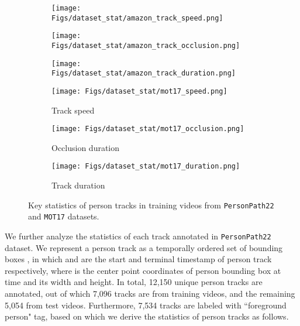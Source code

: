 \documentclass[runningheads]{llncs}
\begin{document}
\begin{figure}[t]
\centering

    \begin{subfigure}{0.26\textwidth}
        \centering
        \texttt{[image: Figs/dataset\_stat/amazon\_track\_speed.png]}
    \end{subfigure}\begin{subfigure}{0.26\textwidth}
        \centering
        \texttt{[image: Figs/dataset\_stat/amazon\_track\_occlusion.png]}
    \end{subfigure}\begin{subfigure}{0.26\textwidth}
        \centering
        \texttt{[image: Figs/dataset\_stat/amazon\_track\_duration.png]}
    \end{subfigure}

    \begin{subfigure}{0.26\textwidth}
        \centering
        \texttt{[image: Figs/dataset\_stat/mot17\_speed.png]}
        \caption{ \small Track speed}
        \label{fig:dataset_stat_speed}
    \end{subfigure}\begin{subfigure}{0.26\textwidth}
        \centering
        \texttt{[image: Figs/dataset\_stat/mot17\_occlusion.png]}
        \caption{ \small Occlusion duration}
        \label{fig:dataset_stat_occlusion}
    \end{subfigure}\begin{subfigure}{0.26\textwidth}
         \centering
         \texttt{[image: Figs/dataset\_stat/mot17\_duration.png]}
        \caption{ \small Track duration}
        \label{fig:dataset_stat_length}
    \end{subfigure}
    \caption{ \small Key statistics of person tracks in training videos from \texttt{PersonPath22}  and \texttt{MOT17} datasets.
}
\end{figure}










We further analyze the statistics of each track annotated in \texttt{PersonPath22} dataset.
We represent a person track as a temporally ordered set of bounding boxes , in which  and  are the start and terminal timestamp of person track  respectively,  where  is the center point coordinates of person bounding box at time  and  its width and height. 
In total, 12,150 unique person tracks are annotated, out of which 7,096 tracks are from training videos, and the remaining 5,054 from test videos. Furthermore, 7,534 tracks are labeled with ``foreground person" tag, based on which we derive the statistics of person tracks as follows.
\end{document}
